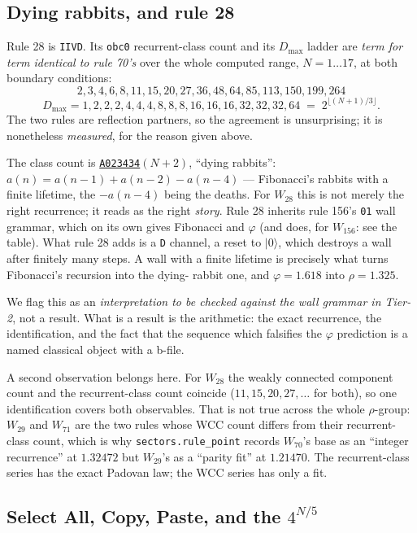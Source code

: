 \documentclass[11pt]{article}
\newcommand{\rt}[1]{\texttt{#1}}
\newcommand{\fn}[1]{\texttt{#1}}
\newcommand{\oeis}[1]{\href{https://oeis.org/#1}{\texttt{#1}}}
\theoremstyle{plain}
\begin{document}
\subsection{Dying rabbits, and rule 28}
\label{sec:rabbits}

Rule 28 is \rt{IIVD}. Its \rt{obc0} recurrent-class count and its $D_{\max}$
ladder are \emph{term for term identical to rule 70's} over the whole computed
range, $N=1\ldots17$, at both boundary conditions:
\[
2,3,4,6,8,11,15,20,27,36,48,64,85,113,150,199,264
\]
\[
D_{\max} = 1,2,2,2,4,4,4,8,8,8,16,16,16,32,32,32,64 \;=\; 2^{\lfloor (N+1)/3\rfloor}.
\]
The two rules are reflection partners, so the agreement is unsurprising; it is
nonetheless \emph{measured}, for the reason given above.

The class count is \oeis{A023434}$(N+2)$, ``dying rabbits'':
$a(n)=a(n-1)+a(n-2)-a(n-4)$ --- Fibonacci's rabbits with a finite lifetime, the
$-a(n-4)$ being the deaths. For $W_{28}$ this is not merely the right
recurrence; it reads as the right \emph{story}. Rule 28 inherits rule 156's
\rt{01} wall grammar, which on its own gives Fibonacci and $\varphi$ (and does,
for $W_{156}$: see the table). What rule 28 adds is a \rt{D} channel, a reset to
$|0\rangle$, which destroys a wall after finitely many steps. A wall with a
finite lifetime is precisely what turns Fibonacci's recursion into the dying-
rabbit one, and $\varphi=1.618$ into $\rho=1.325$.

We flag this as an \emph{interpretation to be checked against the wall grammar
in Tier-2}, not a result. What is a result is the arithmetic: the exact
recurrence, the identification, and the fact that the sequence which falsifies
the $\varphi$ prediction is a named classical object with a b-file.

A second observation belongs here. For $W_{28}$ the weakly connected component
count and the recurrent-class count coincide ($11,15,20,27,\ldots$ for both), so
one identification covers both observables. That is not true across the whole
$\rho$-group: $W_{29}$ and $W_{71}$ are the two rules whose WCC count differs
from their recurrent-class count, which is why \fn{sectors.rule\_point} records
$W_{70}$'s base as an ``integer recurrence'' at $1.32472$ but $W_{29}$'s as a
``parity fit'' at $1.21470$. The recurrent-class series has the exact Padovan
law; the WCC series has only a fit.

\subsection{Select All, Copy, Paste, and the $4^{N/5}$}
\label{sec:copypaste}
\end{document}
